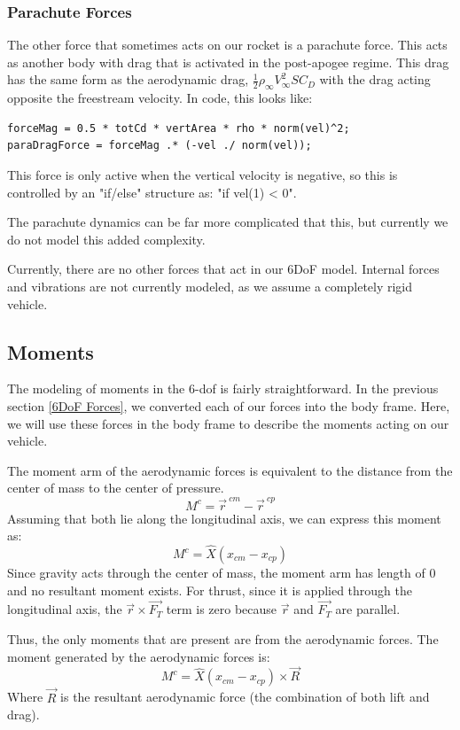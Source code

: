 \documentclass[12pt]{report}
\begin{document}
{\subsubsection{Parachute Forces}
The other force that sometimes acts on our rocket is a parachute force. This acts as another body with drag that is activated in the post-apogee regime. This drag has the same form as the aerodynamic drag, $\frac{1}{2}\rho_{\infty} V_{\infty}^2SC_D$ with the drag acting opposite the freestream velocity. In code, this looks like:
\begin{lstlisting}[style=Matlab-editor]
forceMag = 0.5 * totCd * vertArea * rho * norm(vel)^2;
paraDragForce = forceMag .* (-vel ./ norm(vel)); 
\end{lstlisting}
This force is only active when the vertical velocity is negative, so this is controlled by an "if/else" structure as: "if vel(1) < 0". 

The parachute dynamics can be far more complicated that this, but currently we do not model this added complexity. 

Currently, there are no other forces that act in our 6DoF model. Internal forces and vibrations are not currently modeled, as we assume a completely rigid vehicle.
\subsection{Moments}
The modeling of moments in the 6-\gls{dof} is fairly straightforward. In the previous section \ref{6DoF Forces}, we converted each of our forces into the body frame. Here, we will use these forces in the body frame to describe the moments acting on our vehicle. 

The moment arm of the aerodynamic forces is equivalent to the distance from the center of mass to the center of pressure. 
\begin{equation}
    M^c=\vec{r}^{\ cm}-\vec{r}^{\ cp}
\end{equation}
Assuming that both lie along the longitudinal axis, we can express this moment as:
\begin{equation}
    M^c=\hat{X}(x_{cm}-x_{cp})
\end{equation}
Since gravity acts through the center of mass, the moment arm has length of 0 and no resultant moment exists. For thrust, since it is applied through the longitudinal axis, the $\vec{r}\times \vec{F_T}$ term is zero because $\vec{r}$ and $\vec{F_T}$ are parallel.

Thus, the only moments that are present are from the aerodynamic forces. The moment generated by the aerodynamic forces is:
\begin{equation}
    M^c=\hat{X}(x_{cm}-x_{cp})\times \vec{R}
\end{equation}
Where $\vec{R}$ is the resultant aerodynamic force (the combination of both lift and drag).

}
\end{document}
